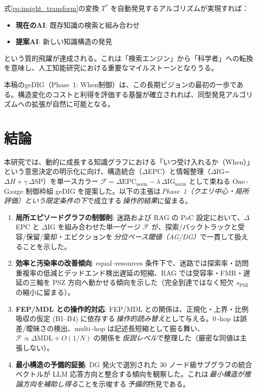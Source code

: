 \documentclass[ja=standard,xelatex]{bxjsarticle}
\newcommand{\F}{\mathcal{F}}
\newcommand{\gednorm}{\Delta\mathrm{EPC}_{\mathrm{norm}}}
\newcommand{\ignorm}{\Delta\mathrm{IG}_{\mathrm{norm}}}
\begin{document}
式\eqref{eq:insight_transform}の変換 $T^*$ を自動発見するアルゴリズムが実現すれば：
\begin{itemize}[leftmargin=1.8em]
  \item \textbf{現在のAI}: 既存知識の検索と組み合わせ
  \item \textbf{提案AI}: 新しい知識構造の発見
\end{itemize}
という質的飛躍が達成される。これは「検索エンジン」から「科学者」への転換を意味し、人工知能研究における重要なマイルストーンとなりうる。

本稿のgeDIG（Phase~1: When制御）は、この長期ビジョンの最初の一歩である。構造変化のコストと利得を評価する基盤が確立されれば、同型発見アルゴリズムへの拡張が自然に可能となる。

\section{結論}

本研究では、動的に成長する知識グラフにおける「いつ受け入れるか（When）」という意思決定の明示化に向け、構造統合（$\Delta$EPC）と情報整理（$\Delta$IG=$\Delta H{+}\gamma\,\Delta\mathrm{SP}$）を単一スカラー $\F=\gednorm-\lambda\,\ignorm$ として束ねる One\,\mbox{-}Gauge 制御枠組 geDIG を提案した。以下の主張は\,\emph{Phase~1（クエリ中心・局所評価）という限定条件の下}で成立する\,\emph{操作的結果}に留まる。

\begin{enumerate}[leftmargin=1.6em]
  \item \textbf{局所エピソードグラフの制御則}: 迷路および RAG の PoC 設定において、$\Delta$EPC と $\Delta$IG を組み合わせた単一ゲージ $\F$ が、探索/バックトラックと受容/保留/棄却・エビクションを\,\emph{分位ベース閾値（AG/DG）}で一貫して扱えることを示した。
  \item \textbf{効率と汚染率の改善傾向}: equal\,\mbox{-}resources 条件下で、迷路では探索率・訪問重複率の低減とデッドエンド検出遅延の短縮、RAG では受容率・FMR・遅延の三軸を PSZ 方向へ動かせる傾向を示した（完全到達ではなく短欠 $s_{\mathrm{PSZ}}$ の縮小に留まる）。
  \item \textbf{FEP/MDL との操作的対応}: FEP/MDL との関係は、正規化・上界・比例吸収の仮定 (B1–B4) に依存する\,\emph{操作的読み替え}として与える。0\,\mbox{-}hop は誤差/曖昧さの検出、multi\,\mbox{-}hop は記述⻑短縮として振る舞い、$\F\propto\Delta\mathrm{MDL}{+}O(1/N)$ の関係を\,\emph{仮説レベル}で整理した（厳密な同値は主張しない）。
  \item \textbf{最小構造の予備的証拠}: DG 発火で選別された 30 ノード級サブグラフの統合ベクトルが LLM 応答方向と整合する傾向を観察した。これは\,\emph{最小構造が推論方向を補助し得る}ことを示唆する\,\emph{予備的}所見である。
\end{enumerate}
\end{document}
